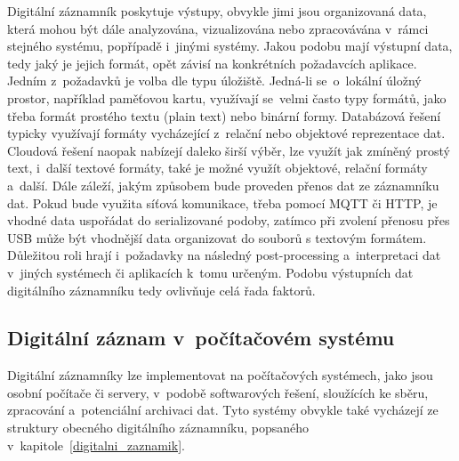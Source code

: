 
Digitální záznamník poskytuje výstupy, obvykle jimi jsou organizovaná data, která mohou být dále analyzována, vizualizována nebo zpracovávána v~rámci stejného systému, popřípadě i~jinými systémy. Jakou podobu mají výstupní data, tedy jaký je jejich formát, opět závisí na konkrétních požadavcích aplikace. Jedním z~požadavků je volba dle typu úložiště. Jedná-li se~o~lokální úložný prostor, například paměťovou kartu, využívají se~velmi často typy formátů, jako třeba formát prostého textu (plain text) nebo binární formy. Databázová řešení typicky využívají formáty vycházející z~relační nebo objektové reprezentace dat. Cloudová řešení naopak nabízejí daleko širší výběr, lze využít jak zmíněný prostý text, i~další textové formáty, také je možné využít objektové, relační formáty a~další. Dále záleží, jakým způsobem bude proveden přenos dat ze záznamníku dat. Pokud bude využita síťová komunikace, třeba pomocí MQTT či HTTP, je vhodné data uspořádat do serializované podoby, zatímco při zvolení přenosu přes USB může být vhodnější data organizovat do souborů s textovým formátem. Důležitou roli hrají i~požadavky na následný post-processing a~interpretaci dat v~jiných systémech či aplikacích k~tomu určeným. Podobu výstupních dat digitálního záznamníku tedy ovlivňuje celá řada faktorů.~\cite{usb_standard_mtp, iot_datalogger_with_timestamping, springer_industry_monitoring, researchgate_general_dataloggger_multiple_sdcards, medium_optimalization_iot_data_storage_timescaledb}

\newpage

\subsection{Digitální záznam v~počítačovém systému}
Digitální záznamníky lze implementovat na počítačových systémech, jako jsou osobní počítače či servery, v~podobě softwarových řešení, sloužících ke sběru, zpracování a~potenciální archivaci dat. Tyto systémy obvykle také vycházejí ze struktury obecného digitálního záznamníku, popsaného v~kapitole~\ref{digitalni_zaznamik}. 

